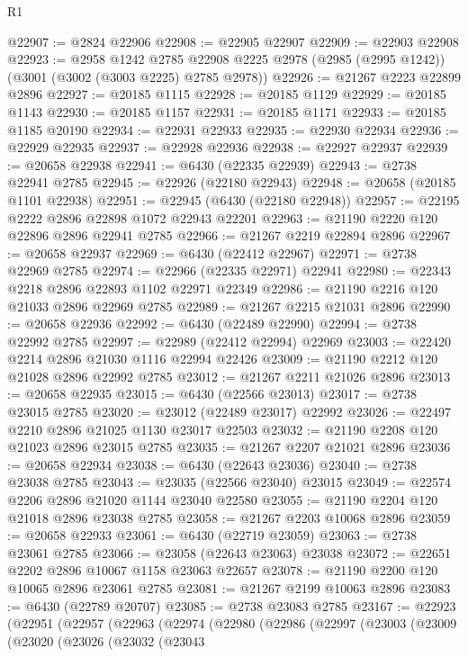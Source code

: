 \begin{lexlean}{R1}
\begin{coremodule}
@22907 := @2824 @22906
@22908 := @22905 @22907
@22909 := @22903 @22908
@22923 := @2958
    @1242
    @2785
    @22908
    @2225
    @2978
    (@2985 (@2995 @1242))
    (@3001 (@3002 (@3003 @2225) @2785 @2978))
@22926 := @21267 @2223 @22899 @2896
@22927 := @20185 @1115
@22928 := @20185 @1129
@22929 := @20185 @1143
@22930 := @20185 @1157
@22931 := @20185 @1171
@22933 := @20185 @1185 @20190
@22934 := @22931 @22933
@22935 := @22930 @22934
@22936 := @22929 @22935
@22937 := @22928 @22936
@22938 := @22927 @22937
@22939 := @20658 @22938
@22941 := @6430 (@22335 @22939)
@22943 := @2738 @22941 @2785
@22945 := @22926 (@22180 @22943)
@22948 := @20658 (@20185 @1101 @22938)
@22951 := @22945 (@6430 (@22180 @22948))
@22957 := @22195 @2222 @2896 @22898 @1072 @22943 @22201
@22963 := @21190 @2220 @120 @22896 @2896 @22941 @2785
@22966 := @21267 @2219 @22894 @2896
@22967 := @20658 @22937
@22969 := @6430 (@22412 @22967)
@22971 := @2738 @22969 @2785
@22974 := @22966 (@22335 @22971) @22941
@22980 := @22343 @2218 @2896 @22893 @1102 @22971 @22349
@22986 := @21190 @2216 @120 @21033 @2896 @22969 @2785
@22989 := @21267 @2215 @21031 @2896
@22990 := @20658 @22936
@22992 := @6430 (@22489 @22990)
@22994 := @2738 @22992 @2785
@22997 := @22989 (@22412 @22994) @22969
@23003 := @22420 @2214 @2896 @21030 @1116 @22994 @22426
@23009 := @21190 @2212 @120 @21028 @2896 @22992 @2785
@23012 := @21267 @2211 @21026 @2896
@23013 := @20658 @22935
@23015 := @6430 (@22566 @23013)
@23017 := @2738 @23015 @2785
@23020 := @23012 (@22489 @23017) @22992
@23026 := @22497 @2210 @2896 @21025 @1130 @23017 @22503
@23032 := @21190 @2208 @120 @21023 @2896 @23015 @2785
@23035 := @21267 @2207 @21021 @2896
@23036 := @20658 @22934
@23038 := @6430 (@22643 @23036)
@23040 := @2738 @23038 @2785
@23043 := @23035 (@22566 @23040) @23015
@23049 := @22574 @2206 @2896 @21020 @1144 @23040 @22580
@23055 := @21190 @2204 @120 @21018 @2896 @23038 @2785
@23058 := @21267 @2203 @10068 @2896
@23059 := @20658 @22933
@23061 := @6430 (@22719 @23059)
@23063 := @2738 @23061 @2785
@23066 := @23058 (@22643 @23063) @23038
@23072 := @22651 @2202 @2896 @10067 @1158 @23063 @22657
@23078 := @21190 @2200 @120 @10065 @2896 @23061 @2785
@23081 := @21267 @2199 @10063 @2896
@23083 := @6430 (@22789 @20707)
@23085 := @2738 @23083 @2785
@23167 := @22923
    (@22951
      (@22957
        (@22963
          (@22974
            (@22980
              (@22986
                (@22997
                  (@23003
                    (@23009
                      (@23020
                        (@23026
                          (@23032
                            (@23043

\end{coremodule}
\end{lexlean}
